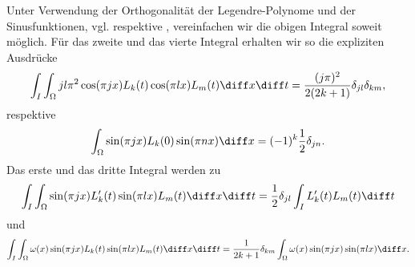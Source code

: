Unter Verwendung der Orthogonalität der Legendre-Polynome und der Sinusfunktionen, vgl.  respektive , vereinfachen wir die obigen Integral soweit möglich.
Für das zweite und das vierte Integral erhalten wir so die expliziten Ausdrücke
\begin{equation}
    \int_{I} \int_{\Omega} j l \pi^2 \cos(\pi j x) L_{k}(t) \cos(\pi l x) L_{m}(t) \diff x \diff t
    = \frac{(j \pi)^{2}}{2(2k + 1)} \delta_{j l}  \delta_{k m},
\end{equation}
respektive
\begin{equation}
    \int_{\Omega} \sin(\pi j x) L_{k}(0) \sin(\pi n x) \diff x = (-1)^{k} \frac{1}{2} \delta_{jn}.
\end{equation}
Das erste und das dritte Integral werden zu
\begin{equation}
    \int_{I} \int_{\Omega} \sin(\pi j x) L_{k}'(t) \sin(\pi l x) L_{m}(t) \diff x \diff t
    = \frac{1}{2} \delta_{j l} \int_{I} L_{k}'(t) L_{m}(t) \diff t
\end{equation}
und
\begin{equation}
    \int_{I} \int_{\Omega} \omega(x) \sin(\pi j x) L_{k}(t) \sin(\pi l x) L_{m}(t) \diff x \diff t
    = \frac{1}{2k +1} \delta_{k m} \int_{\Omega} \omega(x) \sin(\pi j x)\sin(\pi l x) \diff x.
\end{equation}


